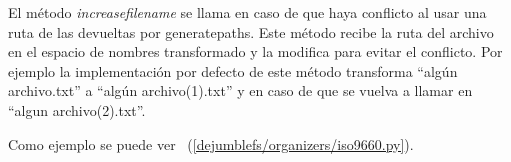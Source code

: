 El método \textit{increasefilename} se llama en caso de que haya conflicto al usar una ruta de las devueltas por generatepaths. Este método recibe la ruta del archivo en el espacio de nombres transformado y la modifica para evitar el conflicto. Por ejemplo la implementación por defecto de este método transforma ``algún archivo.txt'' a ``algún archivo(1).txt'' y en caso de que se vuelva a llamar en ``algun archivo(2).txt''.

Como ejemplo se puede ver ~(\ref{dejumblefs/organizers/iso9660.py}).



